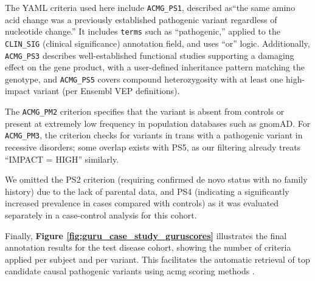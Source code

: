 The YAML criteria used here include \texttt{ACMG\_PS1}, described as``the same amino acid change was a previously established pathogenic variant regardless of nucleotide change.'' It includes \texttt{terms} such as  ``pathogenic,'' applied to the \texttt{CLIN\_SIG} (clinical significance) annotation field, and uses ``or'' logic. 
Additionally, \texttt{ACMG\_PS3} describes well-established functional studies supporting a damaging effect on the gene product, with a user-defined inheritance pattern matching the genotype, and \texttt{ACMG\_PS5} covers compound heterozygosity with at least one high-impact variant (per Ensembl VEP definitions). 

 The \texttt{ACMG\_PM2} criterion specifies that the variant is absent from controls or present at extremely low frequency in population databases such as gnomAD. For \texttt{ACMG\_PM3}, the criterion checks for variants in trans with a pathogenic variant in recessive disorders;  some overlap exists with PS5, as our filtering already treats ``IMPACT = HIGH'' similarly.

We omitted the PS2 criterion (requiring confirmed de novo status with no family history) due to the lack of parental data, and PS4 (indicating a significantly increased prevalence in cases compared with controls) as it was evaluated separately in a case-control analysis for this cohort.

Finally, \textbf{Figure \ref{fig:guru_case_study_guruscores}} illustrates the final annotation results for the test disease cohort, showing the number of criteria applied per subject and per variant. This facilitates the automatic retrieval of top candidate causal pathogenic variants using \ac{acmg} scoring methods \cite{richards2015standards, tavtigian2020fitting}.

